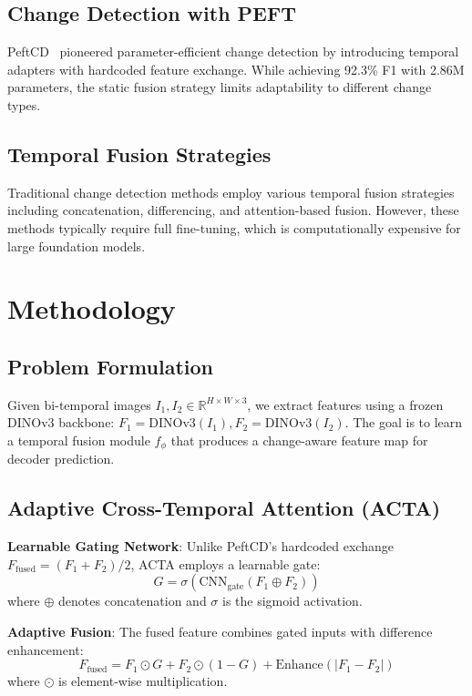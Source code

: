 \documentclass{IEEEtran}
\begin{document}
\subsection{Change Detection with PEFT}

PeftCD~\cite{zhang2024peftcd} pioneered parameter-efficient change detection by introducing temporal adapters with hardcoded feature exchange. While achieving 92.3\% F1 with 2.86M parameters, the static fusion strategy limits adaptability to different change types.

\subsection{Temporal Fusion Strategies}

Traditional change detection methods employ various temporal fusion strategies including concatenation, differencing, and attention-based fusion. However, these methods typically require full fine-tuning, which is computationally expensive for large foundation models.

\section{Methodology}
\label{sec:method}

\subsection{Problem Formulation}

Given bi-temporal images $I_1, I_2 \in \mathbb{R}^{H \times W \times 3}$, we extract features using a frozen DINOv3 backbone: $F_1 = \text{DINOv3}(I_1), F_2 = \text{DINOv3}(I_2)$. The goal is to learn a temporal fusion module $f_\phi$ that produces a change-aware feature map for decoder prediction.

\subsection{Adaptive Cross-Temporal Attention (ACTA)}

\textbf{Learnable Gating Network}: Unlike PeftCD's hardcoded exchange $F_{\text{fused}} = (F_1 + F_2) / 2$, ACTA employs a learnable gate:
\begin{equation}
G = \sigma(\text{CNN}_{\text{gate}}(F_1 \oplus F_2))
\end{equation}
where $\oplus$ denotes concatenation and $\sigma$ is the sigmoid activation.

\textbf{Adaptive Fusion}: The fused feature combines gated inputs with difference enhancement:
\begin{equation}
F_{\text{fused}} = F_1 \odot G + F_2 \odot (1 - G) + \text{Enhance}(|F_1 - F_2|)
\end{equation}
where $\odot$ is element-wise multiplication.
\end{document}
